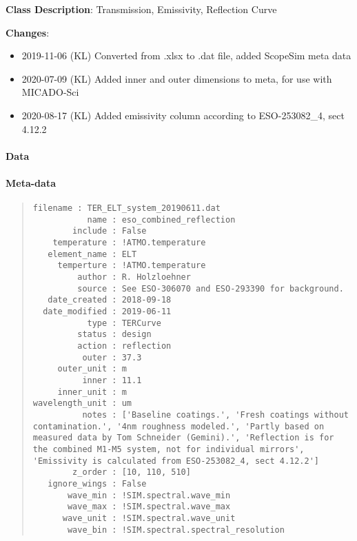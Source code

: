 \textbf{Class Description}: Transmission, Emissivity, Reflection Curve

\textbf{Changes}:

\begin{itemize}
\item 2019-11-06 (KL) Converted from .xlsx to .dat file, added ScopeSim meta data

\item 2020-07-09 (KL) Added inner and outer dimensions to meta, for use with MICADO-Sci

\item 2020-08-17 (KL) Added emissivity column according to ESO-253082\_4, sect 4.12.2
\end{itemize}


\paragraph{Data%
  \label{id3}%
}


\paragraph{Meta-data%
  \label{id4}%
}

\begin{quote}
\begin{alltt}
\begin{lstlisting}[frame=single]
       filename : TER_ELT_system_20190611.dat
           name : eso_combined_reflection
        include : False
    temperature : !ATMO.temperature
   element_name : ELT
     temperture : !ATMO.temperature
         author : R. Holzloehner
         source : See ESO-306070 and ESO-293390 for background.
   date_created : 2018-09-18
  date_modified : 2019-06-11
           type : TERCurve
         status : design
         action : reflection
          outer : 37.3
     outer_unit : m
          inner : 11.1
     inner_unit : m
wavelength_unit : um
          notes : ['Baseline coatings.', 'Fresh coatings without contamination.', '4nm roughness modeled.', 'Partly based on measured data by Tom Schneider (Gemini).', 'Reflection is for the combined M1-M5 system, not for individual mirrors', 'Emissivity is calculated from ESO-253082_4, sect 4.12.2']
        z_order : [10, 110, 510]
   ignore_wings : False
       wave_min : !SIM.spectral.wave_min
       wave_max : !SIM.spectral.wave_max
      wave_unit : !SIM.spectral.wave_unit
       wave_bin : !SIM.spectral.spectral_resolution
\end{lstlisting}
\end{alltt}
\end{quote}
